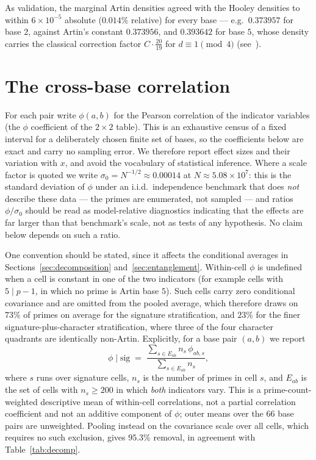 \documentclass[11pt,reqno]{amsart}
\theoremstyle{plain}
\theoremstyle{definition}
\begin{document}
As validation, the marginal Artin densities agreed with the Hooley densities
to within $6 \times 10^{-5}$ absolute ($0.014\%$ relative) for every base ---
e.g.\ $0.373957$ for base $2$, against Artin's constant
$0.373956$, and $0.393642$ for base $5$, whose density carries the classical
correction factor $C \cdot \tfrac{20}{19}$ for
$d \equiv 1 \pmod 4$ (see~\cite{Hooley1967, Moree2012}).

\section{The cross-base correlation}
\label{sec:measurement}

For each pair write $\phi(a,b)$ for the Pearson correlation of the indicator
variables (the $\phi$ coefficient of the $2\times2$ table). This is an exhaustive census of a fixed
interval for a deliberately chosen finite set of bases, so the coefficients
below are exact and carry no sampling error. We therefore report effect sizes
and their variation with $x$, and avoid the vocabulary of statistical
inference. Where a scale factor is quoted we write
$\sigma_0 = N^{-1/2} \approx 0.00014$ at $N \approx 5.08 \times 10^7$: this is
the standard deviation of $\phi$ under an i.i.d.\ independence benchmark that
does \emph{not} describe these data --- the primes are enumerated, not
sampled --- and ratios $\phi/\sigma_0$ should be read as model-relative
diagnostics indicating that the effects are far larger than that benchmark's
scale, not as tests of any hypothesis. No claim below depends on such a ratio.

One convention should be stated, since it affects the conditional averages in
Sections~\ref{sec:decomposition} and~\ref{sec:entanglement}. Within-cell $\phi$
is undefined when a cell is constant in one of the two indicators (for example
cells with $5 \mid p-1$, in which no prime is Artin base $5$). Such cells carry
zero conditional covariance and are omitted from the pooled average, which
therefore draws on $73\%$ of primes on average for the signature
stratification, and $23\%$ for the finer signature-plus-character
stratification, where three of the four character quadrants are identically
non-Artin. Explicitly, for a base pair $(a,b)$ we report
\[
  \phi \mid \mathrm{sig} \;=\;
  \frac{\sum_{s \in E_{ab}} n_s\,\phi_{ab,s}}{\sum_{s \in E_{ab}} n_s},
\]
where $s$ runs over signature cells, $n_s$ is the number of primes in cell $s$,
and $E_{ab}$ is the set of cells with $n_s \ge 200$ in which \emph{both}
indicators vary. This is a prime-count-weighted descriptive mean of within-cell
correlations, not a partial correlation coefficient and not an additive
component of $\phi$; outer means over the $66$ base pairs are unweighted.
Pooling instead on the covariance scale over all cells, which
requires no such exclusion, gives $95.3\%$ removal, in agreement with
Table~\ref{tab:decomp}.
\end{document}
